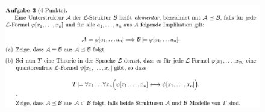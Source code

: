 \documentclass[a4paper]{scrartcl}
\begin{document}
\newpage

\section*{}%
\label{sec:aufgabe_3}

    \begin{figure}[H]
        \centering
        \includegraphics[scale=0.3]{./A-3.png}
        \label{fig:}
    \end{figure}
\end{document}
